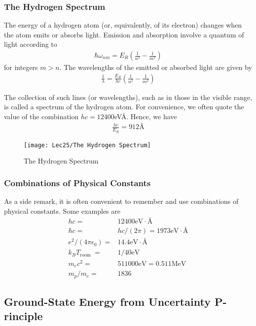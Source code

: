 \subsubsection{The Hydrogen Spectrum}
The energy of a hydrogen atom (or, equivalently, of its electron) changes when the atom emits or absorbs light.
Emission and absorption involve a quantum of light according to
\begin{align*}
    \hbar \omega_{nm}=E_R\left(\frac{1}{n^2}-\frac{1}{m^2}\right)
\end{align*}
for integers $m>n$. The wavelengths of the emitted or absorbed light are given by
\begin{align*}
    \frac{1}{\lambda}=\frac{E_R}{hc}\left(\frac{1}{n^2}-\frac{1}{m^2}\right)
\end{align*}

The collection of such lines (or wavelengths), such as in those in the visible range, is called a spectrum of the hydrogen atom. For convenience, we often quote the value of the combination $hc=12400$eV\AA . Hence, we have
\begin{align*}
    \frac{hc}{E_R}=912\text{\AA}
\end{align*}

\begin{figure}[H]
    \centering
    \texttt{[image: Lec25/The Hydrogen Spectrum]}
    \caption{The Hydrogen Spectrum}
\end{figure}

\subsubsection{Combinations of Physical Constants}
As a side remark, it is often convenient to remember and use combinations of physical constants. Some examples are
\begin{align*}
    h c=&12400 \mathrm{eV} \cdot \text{\AA} \\
    \hbar c=&h c /(2 \pi)=1973 \mathrm{eV} \cdot \text{\AA} \\
    e^{2} /\left(4 \pi \epsilon_{0}\right)=&14.4 \mathrm{eV} \cdot \text{\AA} \\
    k_{B} T_{\text {room }}=&1 / 40 \mathrm{eV} \\
    m_{e} c^{2}=&511000 \mathrm{eV}=0.511 \mathrm{MeV} \\
    m_{p} / m_{e}=&1836
\end{align*}

\subsection{Ground-State Energy from Uncertainty P- rinciple}

